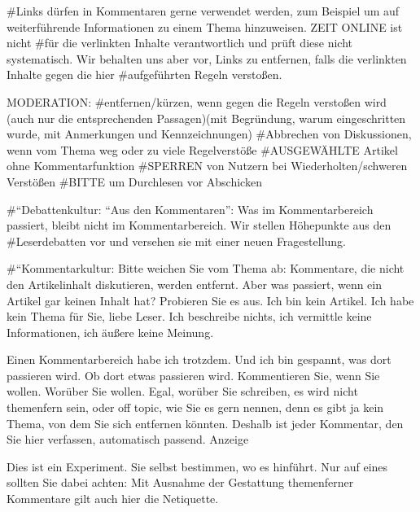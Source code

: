 #Links dürfen in Kommentaren gerne verwendet werden, zum Beispiel um auf weiterführende Informationen zu einem Thema hinzuweisen. ZEIT ONLINE ist nicht #für die verlinkten Inhalte verantwortlich und prüft diese nicht systematisch. Wir behalten uns aber vor, Links zu entfernen, falls die verlinkten Inhalte gegen die hier #aufgeführten Regeln verstoßen.



MODERATION:
#entfernen/kürzen, wenn gegen die Regeln verstoßen wird (auch nur die entsprechenden Passagen)(mit Begründung, warum eingeschritten wurde, mit Anmerkungen und Kennzeichnungen)
#Abbrechen von Diskussionen, wenn vom Thema weg oder zu viele Regelverstöße
#AUSGEWÄHLTE Artikel ohne Kommentarfunktion
#SPERREN von Nutzern bei Wiederholten/schweren Verstößen
#BITTE um Durchlesen vor Abschicken

#``Debattenkultur: ``Aus den Kommentaren'': Was im Kommentarbereich passiert, bleibt nicht im Kommentarbereich. Wir stellen Höhepunkte aus den  #Leserdebatten vor und versehen sie mit einer neuen Fragestellung.


#``Kommentarkultur: Bitte weichen Sie vom Thema ab: Kommentare, die nicht den Artikelinhalt diskutieren, werden entfernt. Aber was passiert, wenn ein Artikel gar keinen Inhalt hat? Probieren Sie es aus. Ich bin kein Artikel. Ich habe kein Thema für Sie, liebe Leser. Ich beschreibe nichts, ich vermittle keine Informationen, ich äußere keine Meinung.

Einen Kommentarbereich habe ich trotzdem. Und ich bin gespannt, was dort passieren wird. Ob dort etwas passieren wird. Kommentieren Sie, wenn Sie wollen. Worüber Sie wollen. Egal, worüber Sie schreiben, es wird nicht themenfern sein, oder off topic, wie Sie es gern nennen, denn es gibt ja kein Thema, von dem Sie sich entfernen könnten. Deshalb ist jeder Kommentar, den Sie hier verfassen, automatisch passend.
Anzeige

Dies ist ein Experiment. Sie selbst bestimmen, wo es hinführt. Nur auf eines sollten Sie dabei achten: Mit Ausnahme der Gestattung themenferner Kommentare gilt auch hier die Netiquette.

















